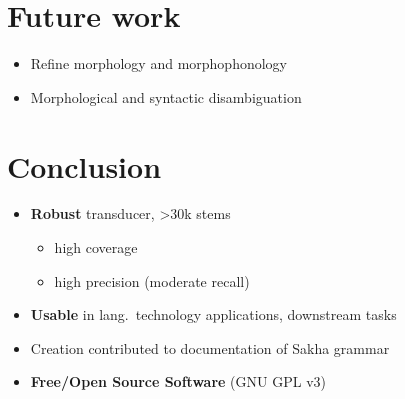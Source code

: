 \documentclass[a0paper,fleqn]{betterposter}
\begin{document}
{%
%

\section{Future work}

\vspace{-2em}
\begin{itemize}
    \item Refine morphology and morphophonology
    \item Morphological and syntactic disambiguation
\end{itemize}
\vspace{-0.5em}

\section{Conclusion}

\vspace{-2em}
\begin{itemize}
    \item \textbf{Robust} transducer, >30k stems
    \begin{itemize}
        \item high coverage
        \item high precision (moderate recall)
    \end{itemize}
    \item \textbf{Usable} in lang.\ technology applications, downstream tasks
    \item Creation contributed to documentation of Sakha grammar
    \item \textbf{Free/Open Source Software} (GNU GPL v3)
\end{itemize}

\vfill

}
\end{document}
